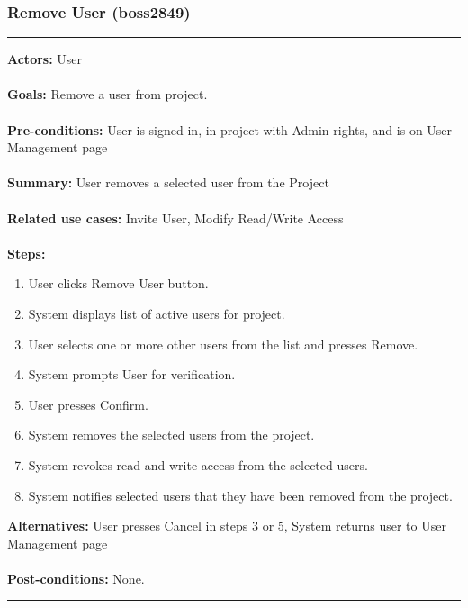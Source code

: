 \documentclass[11pt]{report}
\begin{document}
\subsubsection{Remove User  (boss2849)}
\vspace{2pt}
\hrule
\vspace{8pt}
 \textbf{Actors:} User \\ \\
\textbf{Goals:} Remove a user from project. \\ \\
 \textbf{Pre-conditions:} User is signed in, in project with Admin rights, and is on User Management page\\ \\
 \textbf{Summary:} User removes a selected user from the Project \\ \\
\textbf{Related use cases:} Invite User, Modify Read/Write Access \\ \\
\textbf{Steps:} \begin{enumerate}
  \item User clicks Remove User button.
  \item System displays list of active users for project.
  \item User selects one or more other users from the list and presses Remove.
  \item System prompts User for verification.
  \item User presses Confirm.
  \item System removes the selected users from the project.
  \item System revokes read and write access from the selected users.
  \item System notifies selected users that they have been removed from the project.
 \end{enumerate}
 \textbf{Alternatives:} User presses Cancel in steps 3 or 5, System returns user to User Management page \\ \\
 \textbf{Post-conditions:} None. \\
\vspace{8pt}
\hrule
\newpage
\end{document}
